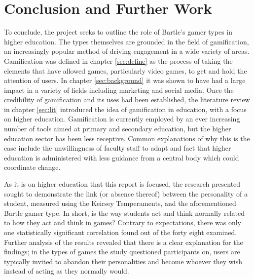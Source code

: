 \documentclass[12pt,a4paper,twoside]{report}
\begin{document}
\chapter{Conclusion and Further Work}
\label{sec:conclusion}
To conclude, the project seeks to outline the role of Bartle's gamer types in higher education. The types themselves are grounded in the field of gamification, an increasingly popular method of driving engagement in a wide variety of areas. Gamification was defined in chapter \ref{sec:define} as the process of taking the elements that have allowed games, particularly video games, to get and hold the attention of users. In chapter \ref{sec:background} it was shown to have had a large impact in a variety of fields including marketing and social media. Once the credibility of gamification and its uses had been established, the literature review in chapter \ref{sec:lit} introduced the idea of gamification in education, with a focus on higher education. Gamification is currently employed by an ever increasing number of tools aimed at primary and secondary education, but the higher education sector has been less receptive. Common explanations of why this is the case include the unwillingness of faculty staff to adapt and fact that higher education is administered with less guidance from a central body which could coordinate change.

As it is on higher education that this report is focused, the research presented sought to demonstrate the link (or absence thereof) between the personality of a student, measured using the Keirsey Temperaments, and the aforementioned Bartle gamer type. In short, is the way students act and think normally related to how they act and think in games? Contrary to expectations, there was only one statistically significant correlation found out of the forty eight examined. Further analysis of the results revealed that there is a clear explanation for the findings; in the types of games the study questioned participants on, users are typically invited to abandon their personalities and become whoever they wish instead of acting as they normally would.
\end{document}
